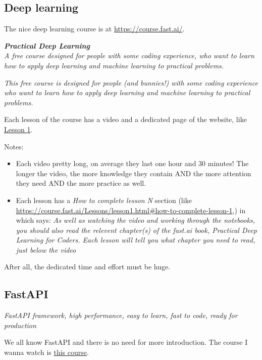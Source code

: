 \documentclass[12pt]{article}
\begin{document}
		\subsection{Deep learning}
			The nice deep learning course is at \url{https://course.fast.ai/}.
			
			\textbf{\textit{Practical Deep Learning}} \\
			\textit{A free course designed for people with some coding experience, who want to learn how to apply deep learning and machine learning to practical problems.}
			
			\textit{This free course is designed for people (and bunnies!) with some coding experience who want to learn how to apply deep learning and machine learning to practical problems.}
			
			Each lesson of the course has a video and a dedicated page of the website, like \href{https://course.fast.ai/Lessons/lesson1.html}{Lesson 1}. 
			
			Notes:
			\begin{itemize}
				\item Each video pretty long, on average they last one hour and 30 minutes! The longer the video, the more knowledge they contain AND the more attention they need AND the more practice as well.
				
				\item Each lesson has a \textit{How to complete lesson N} section (like \url{https://course.fast.ai/Lessons/lesson1.html#how-to-complete-lesson-1},) in which says: \textit{As well as watching the video and working through the notebooks, you should also read the relevent chapter(s) of the fast.ai book, Practical Deep Learning for Coders. Each lesson will tell you what chapter you need to read, just below the video}
			\end{itemize}
		
		    After all, the dedicated time and effort must be huge.
		    	
		\subsection{FastAPI}
			\textit{FastAPI framework, high performance, easy to learn, fast to code, ready for production}
			
			We all know FastAPI and there is no need for more introduction.
			The course I wanna watch is \href{https://www.google.com/url?sa=t&rct=j&q=&esrc=s&source=web&cd=&cad=rja&uact=8&ved=2ahUKEwjUj9jUhOH9AhUPHOwKHdrGCPcQwqsBegQIChAE&url=https%3A%2F%2Fwww.youtube.com%2Fwatch%3Fv%3D0sOvCWFmrtA&usg=AOvVaw0SzlpIrXRghxcsNXprzEkT}{this course}.
			
\end{document}
